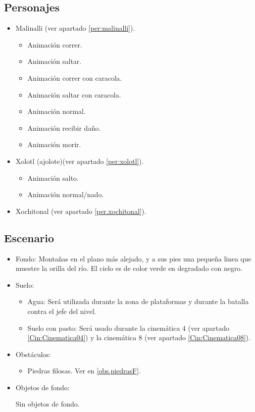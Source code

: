 	\subsection{Personajes}
	\begin{itemize}
		\item Malinalli (ver apartado \ref{per:malinalli}).
		\begin{itemize}
			\item Animación correr.
			\item Animación saltar.
			\item Animación correr con caracola.
			\item Animación saltar con caracola.
			\item Animación normal.
			\item Animación recibir daño.
			\item Animación morir.
		\end{itemize}
		\item Xolotl (ajolote)(ver apartado \ref{per:xolotl}).
			\begin{itemize}
				\item Animación salto.
				\item Animación normal/nado.
			\end{itemize}
		\item Xochitonal (ver apartado \ref{per.xochitonal}).
	\end{itemize}
	
\subsection{Escenario}
\begin{itemize} 
	\item Fondo:
Montañas en el plano más alejado, y a sus pies una pequeña linea que muestre la orilla del río. El cielo es de color verde en degradado con negro.
	\item Suelo:
		\begin{itemize}
			\item Agua: Será utilizada durante la zona de plataformas y durante la batalla contra el jefe del nivel.
			\item Suelo con pasto: Será usado durante la cinemática 4 (ver apartado \ref{Cin:Cinematica04}) y la cinemática 8 (ver apartado \ref{Cin:Cinematica08}).
		\end{itemize}
	\item Obstáculos:
		\begin{itemize}
			\item Piedras filosas. Ver en \ref{obs.piedrasF}.				
		\end{itemize}
	\item Objetos de fondo: 
	\\
	\par	
	Sin objetos de fondo.
	
\end{itemize}	
	
